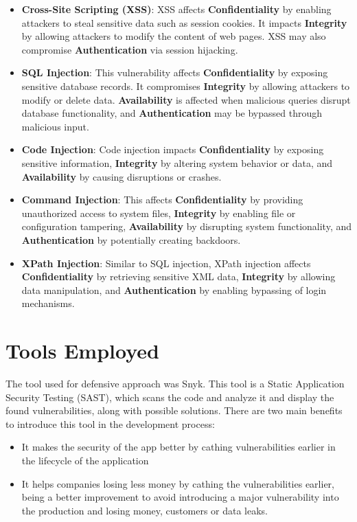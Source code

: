 \documentclass{article}
\begin{document}
\begin{itemize}
    \item \textbf{Cross-Site Scripting (XSS)}:
          XSS affects \textbf{Confidentiality} by enabling attackers to steal sensitive data such as session cookies. It impacts \textbf{Integrity} by allowing attackers to modify the content of web pages. XSS may also compromise \textbf{Authentication} via session hijacking.

    \item \textbf{SQL Injection}:
          This vulnerability affects \textbf{Confidentiality} by exposing sensitive database records. It compromises \textbf{Integrity} by allowing attackers to modify or delete data. \textbf{Availability} is affected when malicious queries disrupt database functionality, and \textbf{Authentication} may be bypassed through malicious input.

    \item \textbf{Code Injection}:
          Code injection impacts \textbf{Confidentiality} by exposing sensitive information, \textbf{Integrity} by altering system behavior or data, and \textbf{Availability} by causing disruptions or crashes.

    \item \textbf{Command Injection}:
          This affects \textbf{Confidentiality} by providing unauthorized access to system files, \textbf{Integrity} by enabling file or configuration tampering, \textbf{Availability} by disrupting system functionality, and \textbf{Authentication} by potentially creating backdoors.

    \item \textbf{XPath Injection}:
          Similar to SQL injection, XPath injection affects \textbf{Confidentiality} by retrieving sensitive XML data, \textbf{Integrity} by allowing data manipulation, and \textbf{Authentication} by enabling bypassing of login mechanisms.
\end{itemize}

\section{Tools Employed}
\label{}

The tool used for defensive approach was Snyk. This tool is a Static Application Security Testing (SAST), which scans the code and analyze it and display the found vulnerabilities, along with possible solutions. There are two main benefits to introduce this tool in the development process:
\begin{itemize}
    \item It makes the security of the app better by cathing vulnerabilities earlier in the lifecycle of the application
    \item It helps companies losing less money by cathing the vulnerabilities earlier, being a better improvement to avoid introducing a major vulnerability into the production and losing money, customers or data leaks.
\end{itemize}
\end{document}
